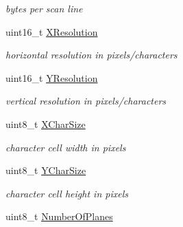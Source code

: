 \begin{DoxyCompactItemize}
\begin{DoxyCompactList}\small\item\em bytes per scan line \end{DoxyCompactList}\item 
\hypertarget{struct____attribute_____a16f6408e5a85c7a7785a0cee64b6a219}{uint16\-\_\-t \hyperlink{struct____attribute_____a16f6408e5a85c7a7785a0cee64b6a219}{X\-Resolution}}\label{struct____attribute_____a16f6408e5a85c7a7785a0cee64b6a219}

\begin{DoxyCompactList}\small\item\em horizontal resolution in pixels/characters \end{DoxyCompactList}\item 
\hypertarget{struct____attribute_____afa8aba2156994750d500f85d0f8425cb}{uint16\-\_\-t \hyperlink{struct____attribute_____afa8aba2156994750d500f85d0f8425cb}{Y\-Resolution}}\label{struct____attribute_____afa8aba2156994750d500f85d0f8425cb}

\begin{DoxyCompactList}\small\item\em vertical resolution in pixels/characters \end{DoxyCompactList}\item 
\hypertarget{struct____attribute_____a047d8f41434f02589d0c9b90b17c67eb}{uint8\-\_\-t \hyperlink{struct____attribute_____a047d8f41434f02589d0c9b90b17c67eb}{X\-Char\-Size}}\label{struct____attribute_____a047d8f41434f02589d0c9b90b17c67eb}

\begin{DoxyCompactList}\small\item\em character cell width in pixels \end{DoxyCompactList}\item 
\hypertarget{struct____attribute_____a330f00ebd49dccd2325d43cdbd646f09}{uint8\-\_\-t \hyperlink{struct____attribute_____a330f00ebd49dccd2325d43cdbd646f09}{Y\-Char\-Size}}\label{struct____attribute_____a330f00ebd49dccd2325d43cdbd646f09}

\begin{DoxyCompactList}\small\item\em character cell height in pixels \end{DoxyCompactList}\item 
\hypertarget{struct____attribute_____a51268efaac55d78e17263aff9a447998}{uint8\-\_\-t \hyperlink{struct____attribute_____a51268efaac55d78e17263aff9a447998}{Number\-Of\-Planes}}\label{struct____attribute_____a51268efaac55d78e17263aff9a447998}


\end{DoxyCompactItemize}
